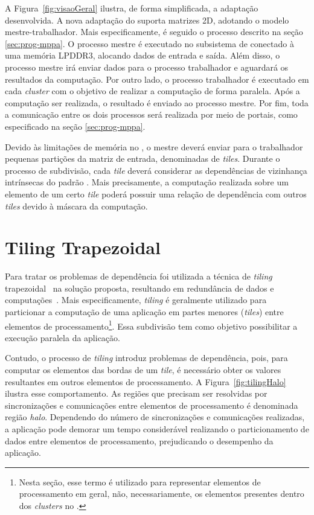 A Figura~\ref{fig:visaoGeral} ilustra, de forma simplificada, a adaptação
desenvolvida. A nova adaptação do \fw suporta matrizes \stencil 2D, adotando o modelo
mestre-trabalhador. Mais especificamente, é seguido o processo descrito na seção
\ref{sec:prog-mppa}. O processo mestre é executado no subsistema de \es conectado
à uma memória LPDDR3, alocando dados de entrada e saída. Além disso, o processo
mestre irá enviar dados para o processo trabalhador e aguardará os resultados da
computação. Por outro lado, o processo trabalhador é executado em cada
\textit{cluster} com o objetivo de realizar a computação \stencil de forma
paralela. Após a computação ser realizada, o resultado é enviado ao processo
mestre. Por fim, toda a comunicação entre os dois processos será realizada por
meio de portais, como especificado na seção \ref{sec:prog-mppa}.

Devido às limitações de memória no \mppa, o mestre deverá enviar para o
trabalhador pequenas partições da matriz de entrada, denominadas de
\textit{tiles}. Durante o processo de subdivisão, cada \textit{tile} deverá
considerar as dependências de vizinhança intrínsecas do padrão \stencil. Mais
precisamente, a computação realizada sobre um elemento de um certo \textit{tile}
poderá possuir uma relação de dependência com outros \textit{tiles} devido à
máscara da computação.


\section{Tiling Trapezoidal}

Para tratar os problemas de dependência foi utilizada a técnica de
\textit{tiling} trapezoidal~\cite{meng11} na solução proposta, resultando em redundância de
dados e computações~\cite{rocha17}. Mais especificamente, \textit{tiling} é
geralmente utilizado para particionar a computação de uma aplicação \stencil em
partes menores (\textit{tiles}) entre elementos de processamento\footnote{Nesta
seção, esse termo é utilizado para representar elementos de processamento em
geral, não, necessariamente, os elementos presentes dentro dos \textit{clusters}
no \mppa.}. Essa subdivisão tem como objetivo possibilitar a execução paralela da aplicação.

Contudo, o processo de \textit{tiling} introduz problemas de dependência, pois,
para computar os elementos das bordas de um \textit{tile}, é necessário obter
os valores resultantes em outros elementos de processamento. A Figura~\ref{fig:tilingHalo} ilustra
esse comportamento. As regiões que precisam ser resolvidas por sincronizações e
comunicações entre elementos de processamento é denominada região \textit{halo}. Dependendo do número
de sincronizações e comunicações realizadas, a aplicação pode demorar um tempo
considerável realizando o particionamento de dados entre elementos de
processamento, prejudicando o desempenho da aplicação.

